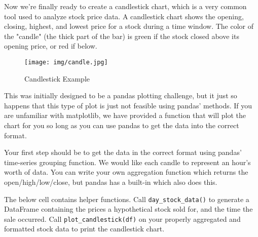 \documentclass[11pt]{article}
\makeatletter
\def\maxwidth{\ifdim\Gin@nat@width>\linewidth\linewidth
    \else\Gin@nat@width\fi}
\let\Oldincludegraphics\includegraphics
\renewcommand{\includegraphics}[1]{\Oldincludegraphics[width=.8\maxwidth]{#1}}
\makeatother
\begin{document}
    Now we're finally ready to create a candlestick chart, which is a very
common tool used to analyze stock price data. A candlestick chart shows
the opening, closing, highest, and lowest price for a stock during a
time window. The color of the "candle" (the thick part of the bar) is
green if the stock closed above its opening price, or red if below.

\begin{figure}
\centering
\texttt{[image: img/candle.jpg]}
\caption{Candlestick Example}
\end{figure}

This was initially designed to be a pandas plotting challenge, but it
just so happens that this type of plot is just not feasible using
pandas' methods. If you are unfamiliar with matplotlib, we have provided
a function that will plot the chart for you so long as you can use
pandas to get the data into the correct format.

Your first step should be to get the data in the correct format using
pandas' time-series grouping function. We would like each candle to
represent an hour's worth of data. You can write your own aggregation
function which returns the open/high/low/close, but pandas has a
built-in which also does this.

    The below cell contains helper functions. Call
\texttt{day\_stock\_data()} to generate a DataFrame containing the
prices a hypothetical stock sold for, and the time the sale occurred.
Call \texttt{plot\_candlestick(df)} on your properly aggregated and
formatted stock data to print the candlestick chart.
\end{document}
